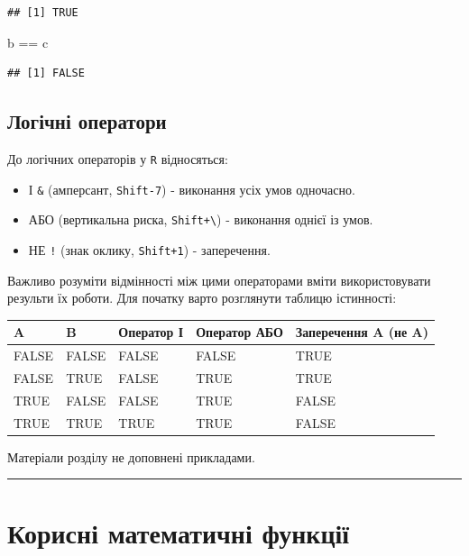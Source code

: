 \documentclass[
]{book}
\newenvironment{Shaded}{\begin{snugshade}}{\end{snugshade}}
\newcommand{\NormalTok}[1]{#1}
\newcommand{\SpecialCharTok}[1]{\textcolor[rgb]{0.00,0.00,0.00}{#1}}
\providecommand{\tightlist}{%
  \setlength{\itemsep}{0pt}\setlength{\parskip}{0pt}}
\begin{document}
\begin{verbatim}
## [1] TRUE
\end{verbatim}

\begin{Shaded}
\begin{Highlighting}[]
\NormalTok{b }\SpecialCharTok{==}\NormalTok{ c}
\end{Highlighting}
\end{Shaded}

\begin{verbatim}
## [1] FALSE
\end{verbatim}

\hypertarget{chapter233}{%
\subsection{Логічні оператори}\label{chapter233}}

До логічних операторів у \texttt{R} відносяться:

\begin{itemize}
\tightlist
\item
  І \texttt{\&} (амперсант, \texttt{Shift-7}) - виконання усіх умов одночасно.
\item
  АБО \texttt{\textbar{}} (вертикальна риска, \texttt{Shift+\textbackslash{}}) - виконання однієї із умов.
\item
  НЕ \texttt{!} (знак оклику, \texttt{Shift+1}) - заперечення.
\end{itemize}

Важливо розуміти відмінності між цими операторами вміти використовувати результи їх роботи. Для початку варто розглянути таблицю істинності:

\begin{longtable}[]{@{}lllll@{}}
\toprule
A & B & Оператор \textbf{І} & Оператор \textbf{АБО} & Заперечення A (\textbf{не A})\tabularnewline
\midrule
\endhead
FALSE & FALSE & FALSE & FALSE & TRUE\tabularnewline
FALSE & TRUE & FALSE & TRUE & TRUE\tabularnewline
TRUE & FALSE & FALSE & TRUE & FALSE\tabularnewline
TRUE & TRUE & TRUE & TRUE & FALSE\tabularnewline
\bottomrule
\end{longtable}

Матеріали розділу не доповнені прикладами.

\begin{center}\rule{0.5\linewidth}{0.5pt}\end{center}

\hypertarget{chapter24}{%
\section{Корисні математичні функції}\label{chapter24}}
\end{document}

